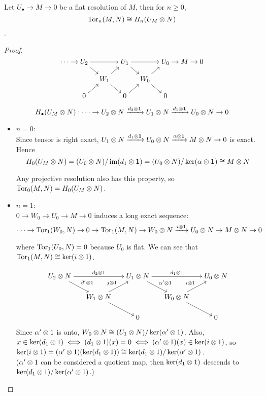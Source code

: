 \begin{theorem}
  Let $U_\bullet \to M \to 0$ be a flat resolution of $M$, then for $n \ge 0$,
  $$\operatorname{Tor}_n(M, N) \cong H_n(U_M \otimes N)$$.
  \begin{proof}
    $$
      \begin{tikzcd}[cramped, sep=10pt]
        \cdots \ar[r] & U_2 \ar[rr] \ar[rd] && U_1 \ar[rr] \ar[rd] && U_0 \ar[r] & M \ar[r] & 0 \\
                      && W_1 \ar[ru] \ar[rd] && W_0 \ar[ru] \ar[rd] \\
                      & 0 \ar[ru] && 0 \ar[ru] && 0
      \end{tikzcd}
    $$

    $$H_\bullet(U_M \otimes N) : \cdots \to U_2 \otimes N \xrightarrow{d_2 \otimes \mathbf{1}} 
    U_1 \otimes N \xrightarrow{d_1 \otimes \mathbf{1}} U_0 \otimes N \to 0$$

    \begin{itemize}
      \item $n=0$: \\ 
        Since tensor is right exact, 
        $U_1 \otimes N \xrightarrow{d_1 \otimes \mathbf{1}} U_0 \otimes N \xrightarrow{\alpha \otimes \mathbf{1}} M \otimes N \to 0$
        is exact.
        Hence
        $$H_0(U_M \otimes N) = (U_0 \otimes N) / \operatorname{im}(d_1 \otimes \mathbf{1}) = (U_0 \otimes N) / \ker(\alpha \otimes \mathbf{1})
        \cong M \otimes N$$

        Any projective resolution also has this property, so $\operatorname{Tor}_0(M, N) = H_0(U_M \otimes N)$.

      \item $n=1$: \\
        $0 \to W_0 \to U_0 \to M \to 0$ induces a long exact sequence:
        $$\cdots \to \operatorname{Tor}_1(W_0, N) \to 0 \to \operatorname{Tor}_1(M, N) 
        \to W_0 \otimes N \xrightarrow{i \otimes 1} U_0 \otimes N \to M \otimes N \to 0$$

        where $\operatorname{Tor}_1(U_0, N) = 0$ because $U_0$ is flat.
        We can see that $\operatorname{Tor}_1(M, N) \cong \ker(i \otimes 1)$.

    $$
      \begin{tikzcd}[cramped, sep=15pt]
        U_2 \Ot N \ar[rr, "d_2 \Ot 1"] \ar[rd, "\beta' \Ot 1"] && 
        U_1 \Ot N \ar[rr, "d_1 \Ot 1"] \ar[rd, "\alpha' \Ot 1"] 
        && U_0 \Ot N\\
        & W_1 \Ot N\ar[ru, "j \Ot 1"] \ar[rd] && 
        W_0 \Ot N \ar[ru, "i \Ot 1"] \ar[rd] \\
        && 0 && 0
      \end{tikzcd}
    $$

    Since $\alpha' \otimes 1$ is onto, $W_0 \otimes N \cong (U_1 \otimes N) / \ker (\alpha' \otimes 1)$.
    Also, $x \in \ker(d_1 \otimes 1) \iff (d_1 \otimes 1)(x) = 0 \iff (\alpha' \otimes 1)(x) \in \ker (i \otimes 1)$,
    so $\ker (i \otimes 1) = (\alpha' \otimes 1)( \ker (d_1 \otimes 1)) \cong \ker (d_1 \otimes 1) / \ker(\alpha' \otimes 1)$. \\
    ($\alpha' \otimes 1$ can be considered a quotient map, then 
    $\ker (d_1 \otimes 1)$ descends to $\ker (d_1 \otimes 1) / \ker (\alpha' \otimes 1)$.)


\end{itemize}
\end{proof}
\end{theorem}

